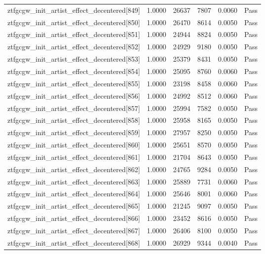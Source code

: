 \begin{table}[htbp]
\begin{tabular}{llrrll}
ztfgcgw\_init\_artist\_effect\_decentered[849] & 1.0000 & 26637 & 7807 & 0.0060 & Pass \\
ztfgcgw\_init\_artist\_effect\_decentered[850] & 1.0000 & 26470 & 8614 & 0.0050 & Pass \\
ztfgcgw\_init\_artist\_effect\_decentered[851] & 1.0000 & 24944 & 8824 & 0.0050 & Pass \\
ztfgcgw\_init\_artist\_effect\_decentered[852] & 1.0000 & 24929 & 9180 & 0.0050 & Pass \\
ztfgcgw\_init\_artist\_effect\_decentered[853] & 1.0000 & 25379 & 8431 & 0.0050 & Pass \\
ztfgcgw\_init\_artist\_effect\_decentered[854] & 1.0000 & 25095 & 8760 & 0.0060 & Pass \\
ztfgcgw\_init\_artist\_effect\_decentered[855] & 1.0000 & 23198 & 8458 & 0.0060 & Pass \\
ztfgcgw\_init\_artist\_effect\_decentered[856] & 1.0000 & 24992 & 8512 & 0.0060 & Pass \\
ztfgcgw\_init\_artist\_effect\_decentered[857] & 1.0000 & 25994 & 7582 & 0.0050 & Pass \\
ztfgcgw\_init\_artist\_effect\_decentered[858] & 1.0000 & 25958 & 8165 & 0.0050 & Pass \\
ztfgcgw\_init\_artist\_effect\_decentered[859] & 1.0000 & 27957 & 8250 & 0.0050 & Pass \\
ztfgcgw\_init\_artist\_effect\_decentered[860] & 1.0000 & 25651 & 8570 & 0.0050 & Pass \\
ztfgcgw\_init\_artist\_effect\_decentered[861] & 1.0000 & 21704 & 8643 & 0.0050 & Pass \\
ztfgcgw\_init\_artist\_effect\_decentered[862] & 1.0000 & 24765 & 9284 & 0.0050 & Pass \\
ztfgcgw\_init\_artist\_effect\_decentered[863] & 1.0000 & 25889 & 7731 & 0.0060 & Pass \\
ztfgcgw\_init\_artist\_effect\_decentered[864] & 1.0000 & 25646 & 8001 & 0.0060 & Pass \\
ztfgcgw\_init\_artist\_effect\_decentered[865] & 1.0000 & 21245 & 9097 & 0.0050 & Pass \\
ztfgcgw\_init\_artist\_effect\_decentered[866] & 1.0000 & 23452 & 8616 & 0.0050 & Pass \\
ztfgcgw\_init\_artist\_effect\_decentered[867] & 1.0000 & 26406 & 8100 & 0.0050 & Pass \\
ztfgcgw\_init\_artist\_effect\_decentered[868] & 1.0000 & 26929 & 9344 & 0.0040 & Pass \\

\end{tabular}
\end{table}
